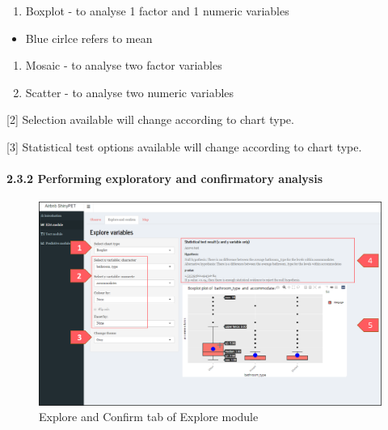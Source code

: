 \documentclass[
  12pt,
]{article}
\providecommand{\tightlist}{%
  \setlength{\itemsep}{0pt}\setlength{\parskip}{0pt}}
\begin{document}
\begin{enumerate}
\def\labelenumi{\roman{enumi})}
\setcounter{enumi}{1}
\tightlist
\item
  Boxplot - to analyse 1 factor and 1 numeric variables
\end{enumerate}

\begin{itemize}
\tightlist
\item
  Blue cirlce refers to mean
\end{itemize}

\begin{enumerate}
\def\labelenumi{\roman{enumi})}
\setcounter{enumi}{2}
\item
  Mosaic - to analyse two factor variables
\item
  Scatter - to analyse two numeric variables
\end{enumerate}

{[}2{]} Selection available will change according to chart type.

{[}3{]} Statistical test options available will change according to
chart type.

\hypertarget{performing-exploratory-and-confirmatory-analysis}{%
\paragraph{2.3.2 Performing exploratory and confirmatory
analysis}\label{performing-exploratory-and-confirmatory-analysis}}

\begin{figure}[H]

{\centering \includegraphics[width=1\linewidth]{images/explore1} 

}

\caption{Explore and Confirm tab of Explore module}\label{fig:unnamed-chunk-9}
\end{figure}
\end{document}
